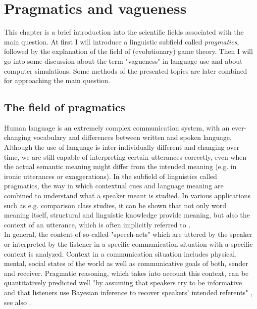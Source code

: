 \chapter{Pragmatics and vagueness}
\label{chapter:vagueness-pragmatics}

This chapter is a brief introduction into the scientific fields associated with the main question. At first I will introduce a linguistic subfield called \textit{pragmatics}, followed by the explanation of the field of (evolutionary) game theory. Then I will go into some discussion about the term "vagueness" in language use and about computer simulations. Some methods of the presented topics are later combined for approaching the main question.

\section{The field of pragmatics}
Human language is an extremely complex communication system, with an 
ever-changing vocabulary and differences between written and spoken language.
Although the use of language is inter-individually different and changing over
time, we are still capable of interpreting certain utterances correctly, even when
the actual semantic meaning might differ from the intended meaning (e.g. in ironic
utterances or exaggerations). In the subfield of linguistics called pragmatics, the way in which contextual cues and language meaning are combined to understand what a speaker meant is studied. In various applications such as e.g. comparison class studies, it can be shown that not only word meaning itself, structural and linguistic knowledge provide meaning, but also the context of an utterance, which is often implicitly referred to \citep[see e.g.][]{tessler2017warm}.\\

In general, the content of so-called "speech-acts" which are uttered by the
speaker or interpreted by the listener in a specific communication situation with
a specific context is analyzed. Context in a communication situation includes physical, mental, social states of the world as well as communicative goals of both, sender and receiver. Pragmatic reasoning, which takes into account this context, can be quantitatively predicted well "by assuming that speakers try to be informative and that listeners use Bayesian inference to recover speakers’ intended referents" \citep{frank2012predicting}, see also \citep{lassiter2013context}.\\

